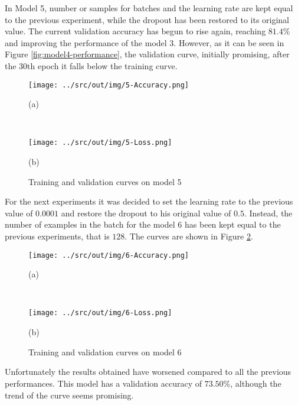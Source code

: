 \documentclass[a4paper,12pt]{article} %
\begin{document}
	In Model 5, number or samples for batches and the learning rate are kept 
	equal to the previous experiment, while the dropout has been restored to 
	its original value. 
	The current validation accuracy has begun to rise again, reaching $81.4\%$ 
	and improving the performance of the model 3. However, as it can be seen in 
	Figure \ref{fig:model4-performance}, the validation curve, initially 
	promising, after the $30\mathrm{th}$ epoch it falls below the training 
	curve.

	\begin{figure}[htb]
		\begin{minipage}[c]{.49\textwidth}
			\centering
			\texttt{[image: ../src/out/img/5-Accuracy.png]}
			\caption*{(a)}
		\end{minipage}
		~
		\begin{minipage}[c]{.49\textwidth}
			\centering
			\texttt{[image: ../src/out/img/5-Loss.png]}
			\caption*{(b)}
		\end{minipage}
		\caption{Training and validation curves on model 5}
		\label{fig:model5-performance}
	\end{figure}

	For the next experiments it was decided to set the learning rate to the 
	previous value of $0.0001$ and restore the dropout to his original value of 
	$0.5$. Instead, the number of examples in the batch for the model 6 has 
	been kept equal to the previous experiments, that is $128$. 
	The curves are shown in Figure \ref{fig:model6-performance}.
		
	\begin{figure}[H]
		\begin{minipage}[c]{.49\textwidth}
			\centering
			\texttt{[image: ../src/out/img/6-Accuracy.png]}
			\caption*{(a)}
		\end{minipage}
		~
		\begin{minipage}[c]{.49\textwidth}
			\centering
			\texttt{[image: ../src/out/img/6-Loss.png]}
			\caption*{(b)}
		\end{minipage}
		\caption{Training and validation curves on model 6}
		\label{fig:model6-performance}
	\end{figure}

	Unfortunately the results obtained have worsened compared to all the 
	previous performances. This model has a validation accuracy of $73.50\%$, 
	although the trend of the curve seems promising.
	\newline
	
\end{document}
